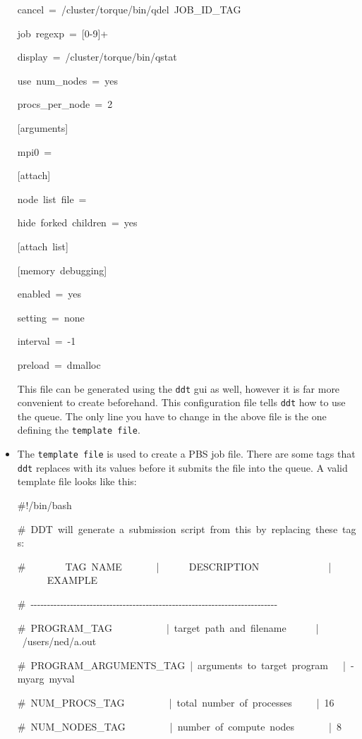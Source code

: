 \begin{itemize}
\begin{lyxcode}
cancel~=~/cluster/torque/bin/qdel~JOB\_ID\_TAG~

job~regexp~=~{[}0-9]+~

display~=~/cluster/torque/bin/qstat~

use~num\_nodes~=~yes~

procs\_per\_node~=~2

{[}arguments]~

mpi0~=

{[}attach]~

node~list~file~=~

hide~forked~children~=~yes

{[}attach~list]

{[}memory~debugging]~

enabled~=~yes~

setting~=~none~

interval~=~-1~

preload~=~dmalloc~
\end{lyxcode}
This file can be generated using the \texttt{ddt} gui as well, however
it is far more convenient to create beforehand. This configuration
file tells \texttt{ddt} how to use the queue. The only line you have
to change in the above file is the one defining the \texttt{template
file}.

\item The \texttt{template file} is used to create a PBS job file. There
are some tags that \texttt{ddt} replaces with its values before it
submits the file into the queue. A valid template file looks like
this:

\begin{lyxcode}
\#!/bin/bash

\#~DDT~will~generate~a~submission~script~from~this~by~replacing~these~tags:~

\#~~~~~~~~TAG~NAME~~~~~~~|~~~~~~DESCRIPTION~~~~~~~~~~~~~~|~~~~~~EXAMPLE~

\#~-{}-{}-{}-{}-{}-{}-{}-{}-{}-{}-{}-{}-{}-{}-{}-{}-{}-{}-{}-{}-{}-{}-{}-{}-{}-{}-{}-{}-{}-{}-{}-{}-{}-{}-{}-{}-{}-{}-{}-{}-{}-{}-{}-{}-{}-{}-{}-{}-{}-{}-{}-{}-{}-{}-{}-{}-{}-{}-{}-{}-{}-{}-{}-{}-{}-{}-{}-{}-{}-{}-{}-{}-{}-{}-~

\#~PROGRAM\_TAG~~~~~~~~~~~|~target~path~and~filename~~~~~~|~/users/ned/a.out~

\#~PROGRAM\_ARGUMENTS\_TAG~|~arguments~to~target~program~~~|~-myarg~myval~

\#~NUM\_PROCS\_TAG~~~~~~~~~|~total~number~of~processes~~~~~|~16~

\#~NUM\_NODES\_TAG~~~~~~~~~|~number~of~compute~nodes~~~~~~~|~8~


\end{lyxcode}
\end{itemize}
